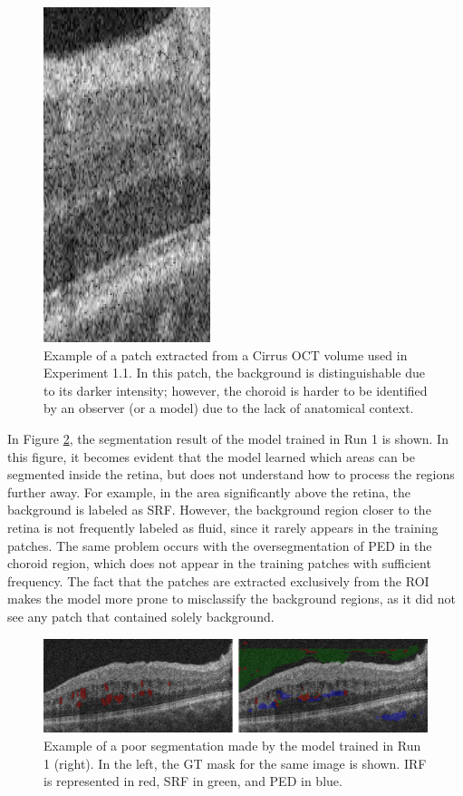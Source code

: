 \begin{figure}[!ht]
	\centering
	\includegraphics[width=0.18\linewidth]{figures/CirrusPatchExample.png}
	\caption{Example of a patch extracted from a Cirrus OCT volume used in Experiment 1.1. In this patch, the background is distinguishable due to its darker intensity; however, the choroid is harder to be identified by an observer (or a model) due to the lack of anatomical context.}
	\label{fig:CirrusPatchExample}
\end{figure}

In Figure \ref{fig:Experiment11Segmentation}, the segmentation result of the model trained in Run 1 is shown. In this figure, it becomes evident that the model learned which areas can be segmented inside the retina, but does not understand how to process the regions further away. For example, in the area significantly above the retina, the background is labeled as SRF. However, the background region closer to the retina is not frequently labeled as fluid, since it rarely appears in the training patches. The same problem occurs with the oversegmentation of PED in the choroid region, which does not appear in the training patches with sufficient frequency. The fact that the patches are extracted exclusively from the ROI makes the model more prone to misclassify the background regions, as it did not see any patch that contained solely background.

\begin{figure}[!ht]
	\centering
	\includegraphics[width=1.0\linewidth]{figures/Experiment11Segmentation.png}
	\caption{Example of a poor segmentation made by the model trained in Run 1 (right). In the left, the GT mask for the same image is shown. IRF is represented in red, SRF in green, and PED in blue.}
	\label{fig:Experiment11Segmentation}
\end{figure}


